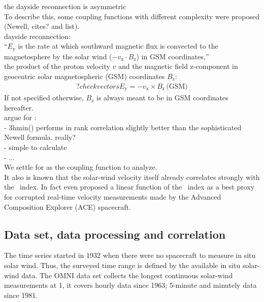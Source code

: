 the dayside reconnection is asymmetric\\

To describe this, some coupling functions with different complexity were proposed (Newell, cites? and list).\\

dayside reconnection:\\
``$E_\text{y}$ is the rate at which southward magnetic flux is convected to the magnetosphere by the solar wind ($-v_\text{x} \cdot B_\text{z}$) in GSM coordinates,'' \citep{Russell2007}\\

the product of the proton velocity $v$ and the magnetic field z-component in geocentric solar magnetospheric (GSM) coordinates $B_\text{z}$:
\begin{align}
	?check vectors  E_\text{y} = -v_\text{x} \times B_\text{z}\,\text{(GSM)}	\label{eq:coupling_vxB}
\end{align}
If not specified otherwise, $B_\text{z}$ is always meant to be in GSM coordinates hereafter.\\

argue for \vBz:\\
- 3hmin(\vBz) performs in rank correlation slightly better than the sophisticated Newell formula. really?\\
- simple to calculate\\
- ...\\

We settle for \vBz{} as the coupling function to analyze.\\

It also is known that the solar-wind velocity itself already correlates strongly with the \Kp~index. In fact \citet{Machol2013} even proposed a linear function of the \Kp~index as a best proxy for corrupted real-time velocity measurements made by the Advanced Composition Explorer (ACE) spacecraft.\\

\subsection{Data set, data processing and correlation}
\label{sec:data_set__data_processing_and_correlation}
The \Kp{} time series started in 1932 when there were no spacecraft to measure in situ solar wind. Thus, the surveyed time range is defined by the available in situ solar-wind data. The OMNI data set collects the longest continuous solar-wind measurements at \SI{1}{\au},
it covers hourly data since 1963; 5-minute and minutely data since 1981.\\

